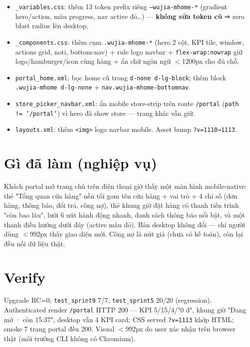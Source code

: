 \begin{itemize}[leftmargin=*]
    \item \texttt{\_variables.css}: thêm 13 token prefix riêng
          \texttt{--wujia-mhome-*} (gradient hero/action, màu progress, nav active
          đỏ\dots) --- \textbf{không sửa token cũ} ⇒ zero blast radius lên desktop.
    \item \texttt{\_components.css}: thêm cụm \texttt{.wujia-mhome-*} (hero 2 cột,
          KPI tile, window, actions grid, noti, bottom-nav) + rule logo navbar +
          \texttt{flex-wrap:nowrap} giữ logo/hamburger/icon cùng hàng + ẩn chữ
          ngôn ngữ \(<\)1200px cho đủ chỗ.
    \item \texttt{portal\_home.xml}: bọc home cũ trong \texttt{d-none d-lg-block};
          thêm block \texttt{.wujia-mhome d-lg-none} + \texttt{nav.wujia-mhome-bottomnav}.
    \item \texttt{store\_picker\_navbar.xml}: ẩn mobile store-strip trên route
          \texttt{/portal} (\texttt{path != '/portal'}) vì hero đã show store ---
          trang khác vẫn giữ.
    \item \texttt{layouts.xml}: thêm \texttt{<img>} logo navbar mobile. Asset bump
          \texttt{?v=1110→1113}.
\end{itemize}

\section{Gì đã làm (nghiệp vụ)}

Khách portal mở trang chủ trên điện thoại giờ thấy một màn hình mobile-native:
thẻ "Tổng quan cửa hàng" nền tối gom tên cửa hàng + vai trò + 4 chỉ số (đơn
hàng, thông báo, đổi trả, công nợ), thẻ khung giờ đặt hàng có thanh tiến trình
"còn bao lâu", lưới 6 nút hành động nhanh, danh sách thông báo nổi bật, và một
thanh điều hướng dưới đáy (active màu đỏ). Bản desktop không đổi --- chỉ người
dùng \(<\)992px thấy giao diện mới. Công nợ là nút giả (chưa có kế toán), còn
lại đều nối dữ liệu thật.

\section{Verify}

Upgrade RC=0; \texttt{test\_sprint9} 7/7, \texttt{test\_sprint5} 20/20 (regression).
Authenticated render \texttt{/portal} HTTP 200 --- KPI 5/15/4/"0 đ", khung giờ
"Đang mở · còn 15:37", desktop vẫn 4 KPI card; CSS served \texttt{?v=1113} khớp
HTML; smoke 7 trang portal đều 200. Visual \(<\)992px do user xác nhận trên
browser thật (môi trường CLI không có Chromium).

